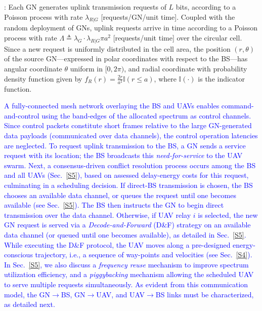\documentclass[12pt, draftcls, onecolumn]{IEEEtran}
\theoremstyle{plain}
\theoremstyle{definition}
\theoremstyle{remark}
\newcommand\hlt[1]{\textcolor{blue}{#1}}
\begin{document}
\label{comm_model_label}
: Each GN generates uplink transmission requests of $L$ bits, according to a Poisson process with rate $\lambda_{R{|}G}$ [requests/GN/unit time]. Coupled with the random deployment of GNs, uplink requests arrive in time according to a Poisson process with rate $\Lambda{\triangleq}\lambda_{G}{\cdot}\lambda_{R{|}G}\pi a^{2}$ [requests/unit time] over the circular cell. Since a new request is uniformly distributed in the cell area, the position $(r,\theta)$ of the source GN---expressed in polar coordinates with respect to the BS---has angular coordinate $\theta$ uniform in $[0,2\pi)$, and radial coordinate with probability density function given by $f_{R}(r){=}\frac{2r}{a^2}\mathbb{I}(r{\leq}a)$, where $\mathbb{I}(\cdot)$ is the indicator function. 

\hlt{A fully-connected mesh network overlaying the BS and UAVs enables command-and-control using the band-edges of the allocated spectrum as control channels. Since control packets constitute short frames relative to the large GN-generated data payloads (communicated over data channels), the control operation latencies are neglected. To request uplink transmission to the BS, a GN sends a service request with its location; the BS broadcasts this \emph{need-for-service} to the UAV swarm. Next, a consensus-driven conflict resolution process occurs among the BS and all UAVs (Sec.~\ref{S5}), based on assessed delay-energy costs for this request, culminating in a scheduling decision. If direct-BS transmission is chosen, the BS chooses an available data channel, or queues the request until one becomes available (see Sec.~\ref{S5}). The BS then instructs the GN to begin direct transmission over the data channel. Otherwise, if UAV relay $i$ is selected, the new GN request is served via a \emph{Decode-and-Forward} (D\&F) strategy on an available data channel (or queued until one becomes available), as detailed in Sec.~\ref{S5}. While executing the D\&F protocol, the UAV moves along a pre-designed energy-conscious trajectory, i.e., a sequence of way-points and velocities (see Sec.~\ref{S4}). In Sec.~\ref{S5}, we also discuss a \emph{frequency reuse} mechanism to improve spectrum utilization efficiency, and a \emph{piggybacking} mechanism allowing the scheduled UAV to serve multiple requests simultaneously. As evident from this communication model, the GN$\rightarrow$BS, GN$\rightarrow$UAV, and UAV$\rightarrow$BS links must be characterized, as detailed next.}
\end{document}

